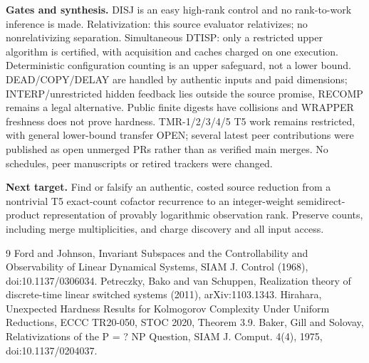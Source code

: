\documentclass[11pt]{article}
\begin{document}
\noindent\textbf{Gates and synthesis.} DISJ is an easy high-rank control and no rank-to-work inference is made. Relativization: this source evaluator relativizes; no nonrelativizing separation. Simultaneous DTISP: only a restricted upper algorithm is certified, with acquisition and caches charged on one execution. Deterministic configuration counting is an upper safeguard, not a lower bound. DEAD/COPY/DELAY are handled by authentic inputs and paid dimensions; INTERP/unrestricted hidden feedback lies outside the source promise, RECOMP remains a legal alternative. Public finite digests have collisions and WRAPPER freshness does not prove hardness. TMR-1/2/3/4/5 T5 work remains restricted, with general lower-bound transfer OPEN; several latest peer contributions were published as open unmerged PRs rather than as verified main merges. No schedules, peer manuscripts or retired trackers were changed.
\par\noindent\textbf{Next target.} Find or falsify an authentic, costed source reduction from a nontrivial T5 exact-count cofactor recurrence to an integer-weight semidirect-product representation of provably logarithmic observation rank. Preserve counts, including merge multiplicities, and charge discovery and all input access.
\begin{thebibliography}{9}
 Ford and Johnson, Invariant Subspaces and the Controllability and Observability of Linear Dynamical Systems, SIAM J. Control (1968), doi:10.1137/0306034.
 Petreczky, Bako and van Schuppen, Realization theory of discrete-time linear switched systems (2011), arXiv:1103.1343.
 Hirahara, Unexpected Hardness Results for Kolmogorov Complexity Under Uniform Reductions, ECCC TR20-050, STOC 2020, Theorem 3.9.
 Baker, Gill and Solovay, Relativizations of the P = ? NP Question, SIAM J. Comput. 4(4), 1975, doi:10.1137/0204037.
\end{thebibliography}
\end{document}
